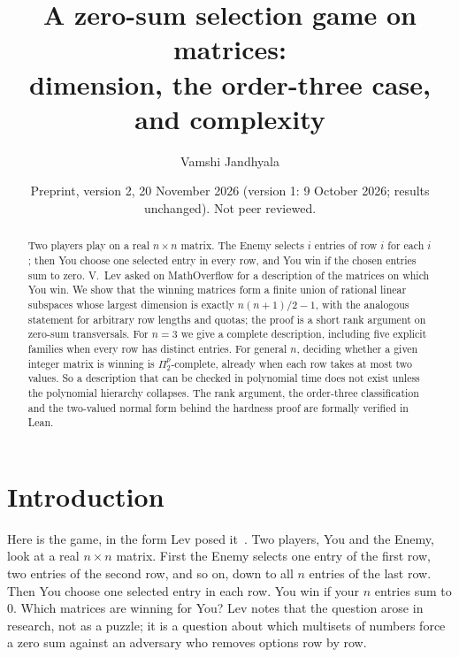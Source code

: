 \documentclass[11pt]{article}
\title{A zero-sum selection game on matrices:\\ dimension, the order-three case, and complexity}
\author{Vamshi Jandhyala}
\date{Preprint, version 2, 20 November 2026 (version 1: 9 October 2026; results unchanged). Not peer reviewed.}
\theoremstyle{definition}
\theoremstyle{remark}
\begin{document}
\maketitle

\begin{abstract}
Two players play on a real $n\times n$ matrix. The Enemy selects $i$ entries of row $i$ for each $i$; then You choose one selected entry in every row, and You win if the chosen entries sum to zero. V.~Lev asked on MathOverflow for a description of the matrices on which You win. We show that the winning matrices form a finite union of rational linear subspaces whose largest dimension is exactly $n(n+1)/2-1$, with the analogous statement for arbitrary row lengths and quotas; the proof is a short rank argument on zero-sum transversals. For $n=3$ we give a complete description, including five explicit families when every row has distinct entries. For general $n$, deciding whether a given integer matrix is winning is $\Pi_2^p$-complete, already when each row takes at most two values. So a description that can be checked in polynomial time does not exist unless the polynomial hierarchy collapses. The rank argument, the order-three classification and the two-valued normal form behind the hardness proof are formally verified in Lean.
\end{abstract}

\section{Introduction}

Here is the game, in the form Lev posed it~\cite{MO}. Two players, You and the Enemy, look at a real $n\times n$ matrix. First the Enemy selects one entry of the first row, two entries of the second row, and so on, down to all $n$ entries of the last row. Then You choose one selected entry in each row. You win if your $n$ entries sum to $0$. Which matrices are winning for You? Lev notes that the question arose in research, not as a puzzle; it is a question about which multisets of numbers force a zero sum against an adversary who removes options row by row.
\end{document}
